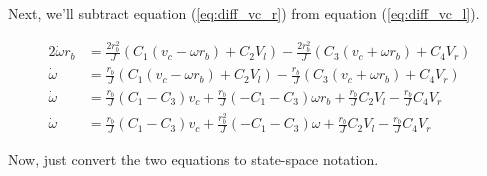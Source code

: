 Next, we'll subtract equation (\ref{eq:diff_vc_r}) from equation
(\ref{eq:diff_vc_l}).

\begin{align*}
  2\dot{\omega} r_b &= \frac{2r_b^2}{J}
    \left(C_1(v_c - \omega r_b) + C_2 V_l\right) -
    \frac{2r_b^2}{J} \left(C_3(v_c + \omega r_b) + C_4 V_r\right) \\
  \dot{\omega} &= \frac{r_b}{J} \left(C_1(v_c - \omega r_b) + C_2 V_l\right) -
    \frac{r_b}{J} \left(C_3(v_c + \omega r_b) + C_4 V_r\right) \\
  \dot{\omega} &= \frac{r_b}{J} (C_1 - C_3) v_c +
    \frac{r_b}{J} (-C_1 - C_3) \omega r_b + \frac{r_b}{J} C_2 V_l -
    \frac{r_b}{J} C_4 V_r \\
  \dot{\omega} &= \frac{r_b}{J} (C_1 - C_3) v_c +
    \frac{r_b^2}{J} (-C_1 - C_3) \omega + \frac{r_b}{J} C_2 V_l -
    \frac{r_b}{J} C_4 V_r
\end{align*}

Now, just convert the two equations to state-space notation.

